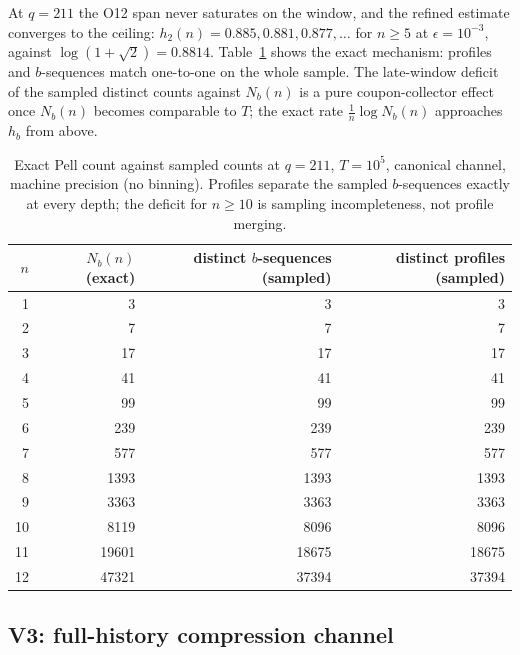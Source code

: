 \documentclass[11pt]{article}
\newcommand{\Nb}{N_b}
\newcommand{\hb}{h_b}
\begin{document}
At $q=211$ the O12 span never saturates on the window, and the refined estimate converges to the ceiling:
$h_2(n)=0.885,0.881,0.877,\dots$ for $n\ge5$ at $\epsilon=10^{-3}$, against
$\log(1+\sqrt2)=0.8814$.
Table~\ref{tab:pell} shows the exact mechanism: profiles and $b$-sequences match one-to-one on the whole
sample.
The late-window deficit of the sampled distinct counts against $\Nb(n)$ is a pure coupon-collector effect
once $\Nb(n)$ becomes comparable to $T$; the exact rate $\tfrac1n\log\Nb(n)$ approaches $\hb$ from above.

\begin{table}[t]
\centering
\begin{tabular}{rrrr}
\toprule
$n$ & $\Nb(n)$ (exact) & distinct $b$-sequences (sampled) & distinct profiles (sampled) \\
\midrule
1 & 3 & 3 & 3 \\
2 & 7 & 7 & 7 \\
3 & 17 & 17 & 17 \\
4 & 41 & 41 & 41 \\
5 & 99 & 99 & 99 \\
6 & 239 & 239 & 239 \\
7 & 577 & 577 & 577 \\
8 & 1393 & 1393 & 1393 \\
9 & 3363 & 3363 & 3363 \\
10 & 8119 & 8096 & 8096 \\
11 & 19601 & 18675 & 18675 \\
12 & 47321 & 37394 & 37394 \\
\bottomrule
\end{tabular}
\caption{Exact Pell count against sampled counts at $q=211$, $T=10^5$, canonical channel, machine precision
(no binning).
Profiles separate the sampled $b$-sequences exactly at every depth; the deficit for $n\ge10$ is sampling
incompleteness, not profile merging.}
\label{tab:pell}
\end{table}

\subsection{V3: full-history compression channel}
\label{sec:v3}
\end{document}

